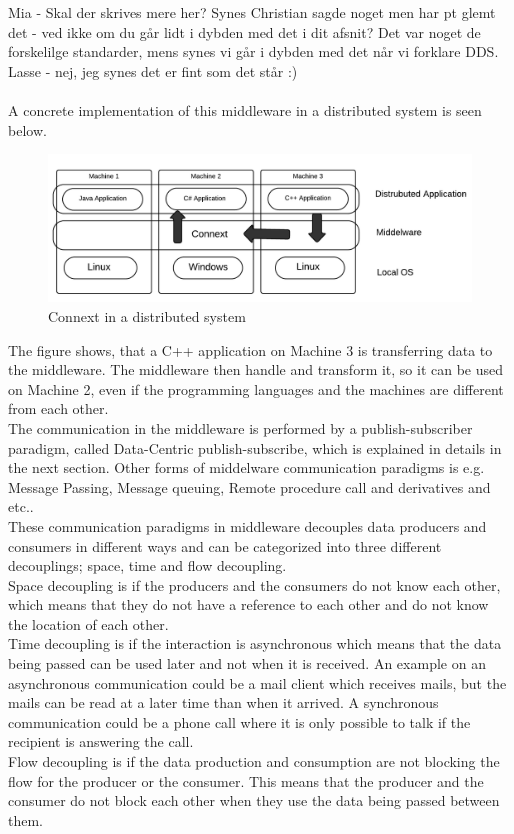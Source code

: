 \documentclass[Main]{subfiles}
\begin{document}
Mia - Skal der skrives mere her? Synes Christian sagde noget men har pt glemt det - ved ikke om du går lidt i dybden med det i dit afsnit? Det var noget de forskelilge standarder, mens synes vi går i dybden med det når vi forklare DDS.
Lasse - nej, jeg synes det er fint som det står :)
\\\\
A concrete implementation of this middleware in a distributed system is seen below.
\begin{figure}[H]
\centering
\includegraphics[scale=0.4]{Figure/MiddelwareImplementation.png}
\caption{Connext in a distributed system}
\end{figure}

The figure shows, that a C++ application on Machine 3 is transferring data to the middleware. The middleware then handle and transform it, so it can be used on Machine 2, even if the programming languages and the machines are different from each other. 
\\
The communication in the middleware is performed by a publish-subscriber paradigm, called Data-Centric publish-subscribe, which is explained in details in the next section. Other forms of middelware communication paradigms is e.g. Message Passing, Message queuing, Remote procedure call and derivatives and etc.\cite{DDS-slides}.\\
These communication paradigms in middleware decouples data producers and consumers in different ways and can be categorized into three different decouplings; space, time and flow decoupling. \\
Space decoupling is if the producers and the consumers do not know each other, which means that they do not have a reference to each other and do not know the location of each other.
\\
Time decoupling is if the interaction is asynchronous which means that the data being passed can be used later and not when it is received. An example on an asynchronous communication could be a mail client which receives mails, but the mails can be read at a later time than when it arrived. A synchronous communication could be a phone call where it is only possible to talk if the recipient is answering the call. \\
Flow decoupling is if the data production and consumption are not blocking the flow for the producer or the consumer. This means that the producer and the consumer do not block each other when they use the data being passed between them. 
\end{document}
